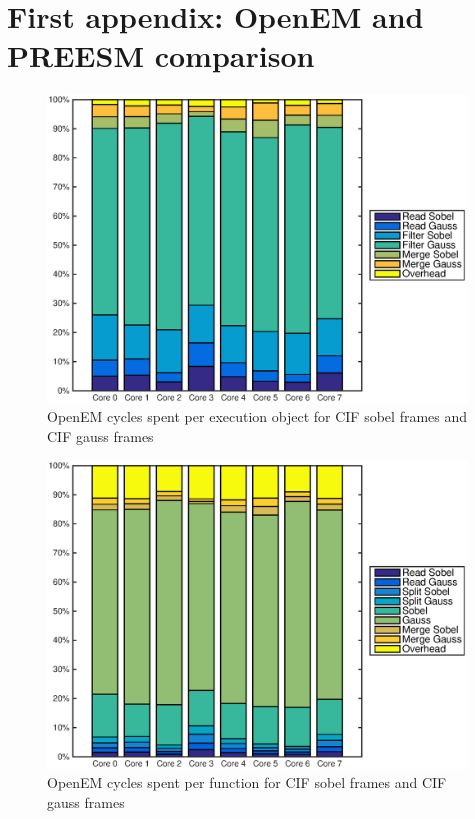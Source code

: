\chapter{First appendix: OpenEM and PREESM comparison}
\label{chapter:first-appendix}

\begin{figure}[h!]
    \begin{center}
        \includegraphics[width=0.99\textwidth]{images/openem_cifcif_8cores_eo.eps}
        \caption{OpenEM cycles spent per execution object for CIF sobel frames and CIF gauss frames}
        \label{fig:oem8coreeo}
    \end{center}
\end{figure}

\begin{figure}[h!]
    \begin{center}
        \includegraphics[width=0.99\textwidth]{images/openem_cifcif_8cores_func.eps}
        \caption{OpenEM cycles spent per function for CIF sobel frames and CIF gauss frames}
        \label{fig:oem8corefunc}
    \end{center}
\end{figure}

